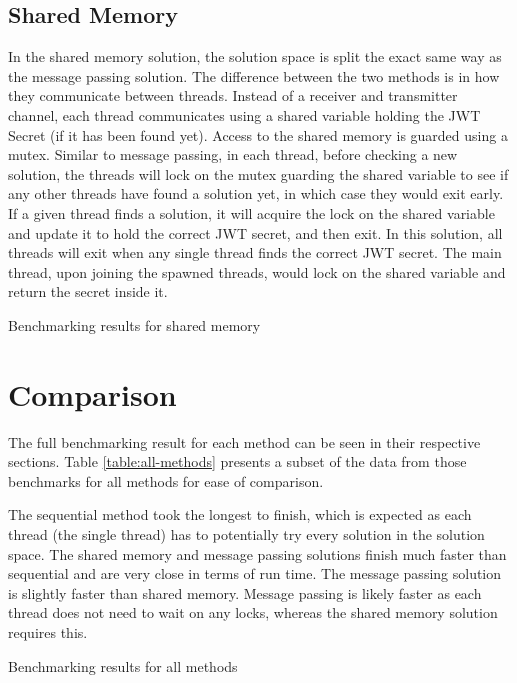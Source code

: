 \documentclass[12pt]{article}
\begin{document}
\subsection{Shared Memory}
In the shared memory solution, the solution space is split the exact same way as the message passing solution. The difference between the two methods is in how they communicate between threads. Instead of a receiver and transmitter channel, each thread communicates using a shared variable holding the JWT Secret (if it has been found yet). Access to the shared memory is guarded using a mutex. Similar to message passing, in each thread, before checking a new solution, the threads will lock on the mutex guarding the shared variable to see if any other threads have found a solution yet, in which case they would exit early. If a given thread finds a solution, it will acquire the lock on the shared variable and update it to hold the correct JWT secret, and then exit. In this solution, all threads will exit when any single thread finds the correct JWT secret. The main thread, upon joining the spawned threads, would lock on the shared variable and return the secret inside it.

\begin{table}
    \centering
    \caption{Benchmarking results for shared memory}
    \label{table:shared-mem}
\end{table}

\section{Comparison}

The full benchmarking result for each method can be seen in their respective sections. Table \ref{table:all-methods} presents a subset of the data from those benchmarks for all methods for ease of comparison. 

The sequential method took the longest to finish, which is expected as each thread (the single thread) has to potentially try every solution in the solution space.
The shared memory and message passing solutions finish much faster than sequential and are very close in terms of run time. The message passing solution is slightly faster than shared memory. Message passing is likely faster as each thread does not need to wait on any locks, whereas the shared memory solution requires this.
\begin{table}
    \centering
    \caption{Benchmarking results for all methods}
    \label{table:all-methods}
\end{table}
\end{document}
